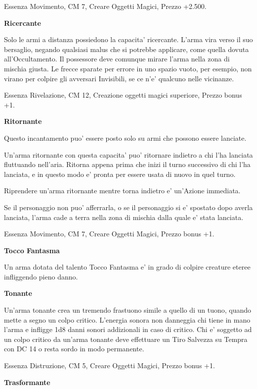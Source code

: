 \documentclass[a4paper,11pt,twoside,openany]{book}
\begin{document}
{		Essenza Movimento, CM 7, Creare Oggetti Magici, Prezzo +2.500.
		
		\textbf{Ricercante}
		
		Solo le armi a distanza possiedono la capacita' ricercante. L'arma vira verso il suo bersaglio, negando qualsiasi malus che si potrebbe applicare, come quella dovuta all'Occultamento. Il possessore deve comunque mirare l'arma nella zona di mischia giusta. Le frecce sparate per errore in uno spazio vuoto, per esempio, non virano per colpire gli avversari Invisibili, se ce n'e' qualcuno nelle vicinanze.
		
		Essenza Rivelazione, CM 12, Creazione oggetti magici superiore, Prezzo bonus +1.
		
		\textbf{Ritornante}
		
		Questo incantamento puo' essere posto solo su armi che possono essere
		lanciate. 
		
		Un'arma ritornante con questa capacita' puo' ritornare indietro a chi l'ha lanciata fluttuando nell'aria. Ritorna appena prima che inizi il turno successivo di chi l'ha lanciata, e in questo modo e' pronta per essere usata di nuovo in quel turno. 
		
		Riprendere un'arma ritornante mentre torna indietro e' un'Azione immediata.
		
		Se il personaggio non puo' afferrarla, o se il personaggio si e' spostato dopo averla lanciata, l'arma cade a terra nella zona di mischia dalla quale e' stata lanciata.
		
		Essenza Movimento, CM 7, Creare Oggetti Magici, Prezzo bonus +1.
		
		\textbf{Tocco Fantasma}
		
		Un arma dotata del talento Tocco Fantasma e' in grado di colpire creature eteree infliggendo pieno danno.
		
		\textbf{Tonante}
		
		Un'arma tonante crea un tremendo frastuono simile a quello di un tuono, quando mette a segno un colpo critico. L'energia sonora non danneggia chi tiene in mano l'arma e infligge 1d8 danni sonori addizionali in caso di critico. Chi e' soggetto ad un colpo critico da un'arma tonante deve effettuare un Tiro Salvezza su Tempra con DC 14 o resta sordo in modo permanente.
		
		Essenza Distruzione, CM 5, Creare Oggetti Magici, Prezzo bonus +1.
		
		\textbf{Trasformante}
		
}
\end{document}
